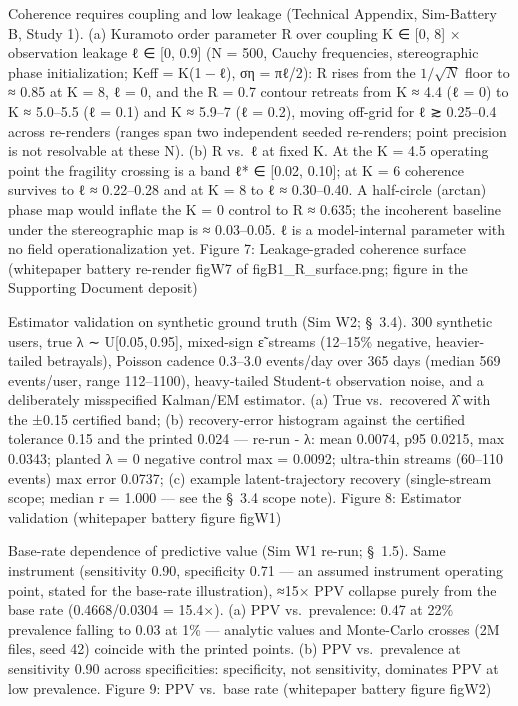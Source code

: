 \documentclass[
]{article}
\begin{document}
Coherence requires coupling and low leakage (Technical Appendix,
Sim-Battery B, Study 1). (a) Kuramoto order parameter R over coupling K
{∈} {[}0, 8{]} {×} observation leakage {ℓ} {∈} {[}0, 0.9{]} (N = 500,
Cauchy frequencies, stereographic phase initialization;
{Keff = K(1 − ℓ)}, {ση = πℓ/2}): R rises from the {\(1/\sqrt{N}\)} floor
to {≈} 0.85 at K = 8, {ℓ} = 0, and the R = 0.7 contour retreats from K
{≈} 4.4 ({ℓ} = 0) to K {≈} 5.0--5.5 ({ℓ} = 0.1) and K {≈} 5.9--7 ({ℓ} =
0.2), moving off-grid for {ℓ} {≳} 0.25--0.4 across re-renders (ranges
span two independent seeded re-renders; point precision is not
resolvable at these N). (b) R vs.~{ℓ} at fixed K. At the K = 4.5
operating point the fragility crossing is a band ℓ* {∈} {[}0.02,
0.10{]}; at K = 6 coherence survives to {ℓ} {≈} 0.22--0.28 and at K = 8
to {ℓ} {≈} 0.30--0.40. A half-circle (arctan) phase map would inflate
the K = 0 control to R {≈} 0.635; the incoherent baseline under the
stereographic map is {≈} 0.03--0.05. {ℓ} is a model-internal parameter
with no field operationalization yet. Figure 7: Leakage-graded coherence
surface (whitepaper battery re-render figW7 of figB1\_R\_surface.png;
figure in the Supporting Document deposit)

Estimator validation on synthetic ground truth (Sim W2; §~3.4). 300
synthetic users, true {λ ∼ U{[}0.05, 0.95{]}}, mixed-sign {ε̃} streams
(12--15\% negative, heavier-tailed betrayals), Poisson cadence 0.3--3.0
events/day over 365 days (median 569 events/user, range 112--1100),
heavy-tailed Student-t observation noise, and a deliberately
misspecified Kalman/EM estimator. (a) True vs.~recovered {λ̂} with the
{±}0.15 certified band; (b) recovery-error histogram against the
certified tolerance 0.15 and the printed 0.024 --- re-run 
- {λ}\textbar: mean 0.0074, p95 0.0215, max 0.0343; planted {λ} = 0
negative control max\textbar{} = 0.0092; ultra-thin streams
(60--110 events) max error 0.0737; (c) example latent-trajectory
recovery (single-stream scope; median r = 1.000 --- see the §~3.4 scope
note). Figure 8: Estimator validation (whitepaper battery figure figW1)

Base-rate dependence of predictive value (Sim W1 re-run; §~1.5). Same
instrument (sensitivity 0.90, specificity 0.71 --- an assumed instrument
operating point, stated for the base-rate illustration), {≈}15{×} PPV
collapse purely from the base rate (0.4668/0.0304 = 15.4{×}). (a) PPV
vs.~prevalence: 0.47 at 22\% prevalence falling to 0.03 at 1\% ---
analytic values and Monte-Carlo crosses (2M files, seed 42) coincide
with the printed points. (b) PPV vs.~prevalence at sensitivity 0.90
across specificities: specificity, not sensitivity, dominates PPV at low
prevalence. Figure 9: PPV vs.~base rate (whitepaper battery figure
figW2)
\end{document}
